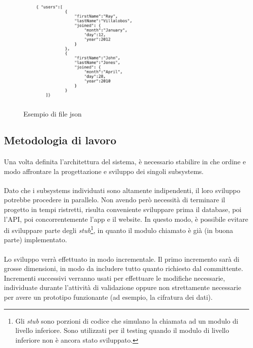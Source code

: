 \documentclass[11pt,a4paper,english]{article}
\begin{document}
\begin{figure}[H]
    \centering
    \includegraphics[width=0.6\textwidth]{img/json.jpeg}
    \caption{Esempio di file json}
\end{figure}


\subsection{Metodologia di lavoro}

\paragraph{} Una volta definita l'architettura del sistema, è necessario stabilire in che ordine e modo affrontare la progettazione e sviluppo dei singoli subsystems. 

\paragraph{} Dato che i subsystems individuati sono altamente indipendenti, il loro sviluppo potrebbe procedere in parallelo. Non avendo però necessità di terminare il progetto in tempi ristretti, risulta conveniente sviluppare prima il database, poi l'API, poi concorrentemente l'app e il website. In questo modo, è possibile evitare di sviluppare parte degli \emph{stub}\footnote{Gli \emph{stub} sono porzioni di codice che simulano la chiamata ad un modulo di livello inferiore. Sono utilizzati per il testing quando il modulo di livello inferiore non è ancora stato sviluppato.}, in quanto il modulo chiamato è già (in buona parte) implementato.

\paragraph{} Lo sviluppo verrà effettuato in modo incrementale. Il primo incremento sarà di grosse dimensioni, in modo da includere tutto quanto richiesto dal committente. Incrementi successivi verranno usati per effettuare le modifiche necessarie, individuate durante l'attività di validazione oppure non strettamente necessarie per avere un prototipo funzionante (ad esempio, la cifratura dei dati). 
\end{document}
